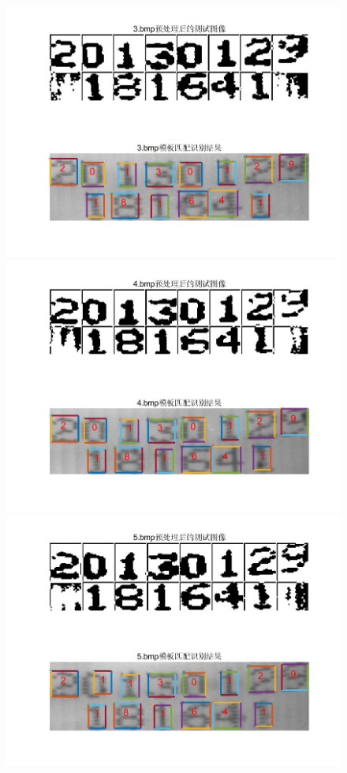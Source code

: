 \documentclass[cn]{elegantbook}
\begin{document}
\begin{figure}[!h]
\begin{minipage}[t]{0.48\textwidth}
		\includegraphics[width=\textwidth]{save3}
	\end{minipage}
	\begin{minipage}[t]{0.48\textwidth}
		\centering
		\includegraphics[width=\textwidth]{save4}
	\end{minipage}
	\begin{minipage}[t]{0.48\textwidth}
		\centering
		\includegraphics[width=\textwidth]{save5}

\end{minipage}
\end{figure}
\end{document}

